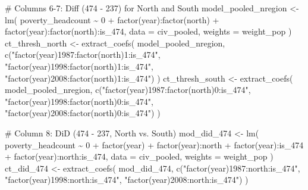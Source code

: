 \documentclass[
  letterpaper,
  DIV=11,
  numbers=noendperiod]{scrartcl}
\newenvironment{Shaded}{\begin{snugshade}}{\end{snugshade}}
\newcommand{\AttributeTok}[1]{\textcolor[rgb]{0.40,0.45,0.13}{#1}}
\newcommand{\CommentTok}[1]{\textcolor[rgb]{0.37,0.37,0.37}{#1}}
\newcommand{\DecValTok}[1]{\textcolor[rgb]{0.68,0.00,0.00}{#1}}
\newcommand{\FunctionTok}[1]{\textcolor[rgb]{0.28,0.35,0.67}{#1}}
\newcommand{\NormalTok}[1]{\textcolor[rgb]{0.00,0.23,0.31}{#1}}
\newcommand{\OtherTok}[1]{\textcolor[rgb]{0.00,0.23,0.31}{#1}}
\newcommand{\SpecialCharTok}[1]{\textcolor[rgb]{0.37,0.37,0.37}{#1}}
\newcommand{\StringTok}[1]{\textcolor[rgb]{0.13,0.47,0.30}{#1}}
\begin{document}
\begin{Shaded}
\begin{Highlighting}[]
\CommentTok{\# Columns 6{-}7: Diff (474 {-} 237) for North and South}
\NormalTok{model\_pooled\_nregion }\OtherTok{\textless{}{-}} \FunctionTok{lm}\NormalTok{(}
\NormalTok{  poverty\_headcount }\SpecialCharTok{\textasciitilde{}} \DecValTok{0} \SpecialCharTok{+} \FunctionTok{factor}\NormalTok{(year)}\SpecialCharTok{:}\FunctionTok{factor}\NormalTok{(north) }\SpecialCharTok{+} \FunctionTok{factor}\NormalTok{(year)}\SpecialCharTok{:}\FunctionTok{factor}\NormalTok{(north)}\SpecialCharTok{:}\NormalTok{is\_474,}
  \AttributeTok{data =}\NormalTok{ civ\_pooled, }\AttributeTok{weights =}\NormalTok{ weight\_pop}
\NormalTok{)}
\NormalTok{ct\_thresh\_north }\OtherTok{\textless{}{-}} \FunctionTok{extract\_coefs}\NormalTok{(}
\NormalTok{  model\_pooled\_nregion,}
  \FunctionTok{c}\NormalTok{(}\StringTok{"factor(year)1987:factor(north)1:is\_474"}\NormalTok{,}
    \StringTok{"factor(year)1998:factor(north)1:is\_474"}\NormalTok{,}
    \StringTok{"factor(year)2008:factor(north)1:is\_474"}\NormalTok{)}
\NormalTok{)}
\NormalTok{ct\_thresh\_south }\OtherTok{\textless{}{-}} \FunctionTok{extract\_coefs}\NormalTok{(}
\NormalTok{  model\_pooled\_nregion,}
  \FunctionTok{c}\NormalTok{(}\StringTok{"factor(year)1987:factor(north)0:is\_474"}\NormalTok{,}
    \StringTok{"factor(year)1998:factor(north)0:is\_474"}\NormalTok{,}
    \StringTok{"factor(year)2008:factor(north)0:is\_474"}\NormalTok{)}
\NormalTok{)}

\CommentTok{\# Column 8: DiD (474 {-} 237, North vs. South)}
\NormalTok{mod\_did\_474 }\OtherTok{\textless{}{-}} \FunctionTok{lm}\NormalTok{(}
\NormalTok{  poverty\_headcount }\SpecialCharTok{\textasciitilde{}} \DecValTok{0} \SpecialCharTok{+} \FunctionTok{factor}\NormalTok{(year) }\SpecialCharTok{+} \FunctionTok{factor}\NormalTok{(year)}\SpecialCharTok{:}\NormalTok{north }\SpecialCharTok{+}
    \FunctionTok{factor}\NormalTok{(year)}\SpecialCharTok{:}\NormalTok{is\_474 }\SpecialCharTok{+} \FunctionTok{factor}\NormalTok{(year)}\SpecialCharTok{:}\NormalTok{north}\SpecialCharTok{:}\NormalTok{is\_474,}
  \AttributeTok{data =}\NormalTok{ civ\_pooled, }\AttributeTok{weights =}\NormalTok{ weight\_pop}
\NormalTok{)}
\NormalTok{ct\_did\_474 }\OtherTok{\textless{}{-}} \FunctionTok{extract\_coefs}\NormalTok{(}
\NormalTok{  mod\_did\_474,}
  \FunctionTok{c}\NormalTok{(}\StringTok{"factor(year)1987:north:is\_474"}\NormalTok{,}
    \StringTok{"factor(year)1998:north:is\_474"}\NormalTok{,}
    \StringTok{"factor(year)2008:north:is\_474"}\NormalTok{)}
\NormalTok{)}


\end{Highlighting}
\end{Shaded}
\end{document}
